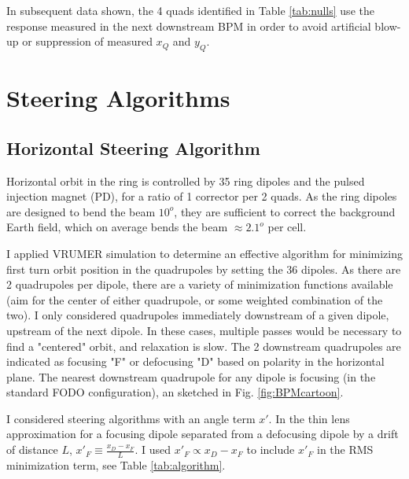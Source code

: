In subsequent data shown, the 4 quads identified in Table \ref{tab:nulls} use the response measured in the next downstream BPM in order to avoid artificial blow-up or suppression of measured $x_Q$ and $y_Q$. 



\section{Steering Algorithms} \label{sec:steering:steeringalgorithm}




\subsection{Horizontal Steering Algorithm}

Horizontal orbit in the ring is controlled by 35 ring dipoles and the pulsed injection magnet (PD), for a ratio of 1 corrector per 2 quads. As the ring dipoles are designed to bend the beam $10^o$, they are sufficient to correct the background Earth field, which on average bends the beam $\approx 2.1^o$ per cell. 

I applied VRUMER simulation to determine an effective algorithm for minimizing first turn orbit position in the quadrupoles by setting the 36 dipoles. As there are 2 quadrupoles per dipole, there are a variety of minimization functions available (aim for the center of either quadrupole, or some weighted combination of the two). I only considered quadrupoles immediately downstream of a given dipole, upstream of the next dipole. In these cases, multiple passes would be necessary to find a "centered" orbit, and relaxation is slow. The 2 downstream quadrupoles are indicated as focusing "F" or defocusing "D" based on polarity in the horizontal plane. The nearest downstream quadrupole for any dipole is focusing (in the standard FODO configuration), an sketched in Fig. \ref{fig:BPMcartoon}.
 
I considered steering algorithms with an angle term $x'$. In the thin lens approximation for a focusing dipole separated from a defocusing dipole by a drift of distance $L$, $x'_F \equiv \frac{x_D-x_F}{L}$. I used $x'_F \propto x_D-x_F$ to include $x'_F$ in the RMS minimization term, see Table \ref{tab:algorithm}.

